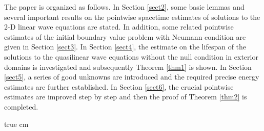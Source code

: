 \documentclass[11pt,twoside]{article}
\theoremstyle{plain}
\theoremstyle{definition}
\numberwithin{equation}{section}
\begin{document}
The paper is organized as follows.
In Section \ref{sect2}, some basic lemmas and several important results on the pointwise spacetime estimates of solutions to the 2-D
linear wave equations are stated. In addition,
some related pointwise estimates of the initial boundary value problem with Neumann condition are given in
Section \ref{sect3}.
In Section \ref{sect4}, the estimate on the lifespan of the solutions to the
quasilinear wave equations without the null condition in exterior domains is investigated and subsequently Theorem \ref{thm1}
is shown.
In Section \ref{sect5}, a series of good unknowns are introduced and the required precise energy estimates are further established.
In Section \ref{sect6}, the crucial pointwise estimates are improved step by step and then the proof of Theorem \ref{thm2}
is completed.

 true cm
\end{document}
